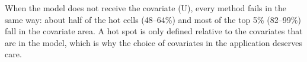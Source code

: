  When the model does not receive the covariate (U), every method fails in the same way: about half of the hot cells (48--64\%) and most of the top 5\% (82--99\%) fall in the covariate area. A hot spot is only defined relative to the covariates that are in the model, which is why the choice of covariates in the application deserves care.



